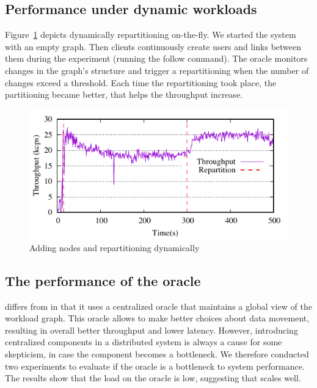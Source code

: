 \subsection{Performance under dynamic workloads}

Figure~\ref{fig:dynamic_load_tput} depicts dynamically repartitioning
on-the-fly.  We started the system with an empty graph. Then clients
continuously create users and links between them during the experiment
(running the follow command).  The oracle monitors changes in the
graph's structure and trigger a repartitioning when the number of
changes exceed a threshold.  Each time the repartitioning took place,
the partitioning became better, that helps the throughput increase.

\begin{figure}[ht]
	\includegraphics{figures/experiments/dynamicload-tp-move-4p}
	\caption{Adding nodes and repartitioning dynamically}
	\label{fig:dynamic_load_tput}
\end{figure}

\subsection{The performance of the oracle}

\dynastar differs from \dssmr in that it uses a centralized oracle
that maintains a global view of the workload graph. This oracle allows
\dynastar to make better choices about data movement, resulting in overall
better throughput and lower latency. However, introducing centralized
components in a distributed system is always a cause for some skepticism,
in case the component becomes a bottleneck. We therefore conducted two
experiments to evaluate if the \dynastar oracle is a bottleneck to
system performance. The results show that the load on the oracle is
low, suggesting that \dynastar scales well.


